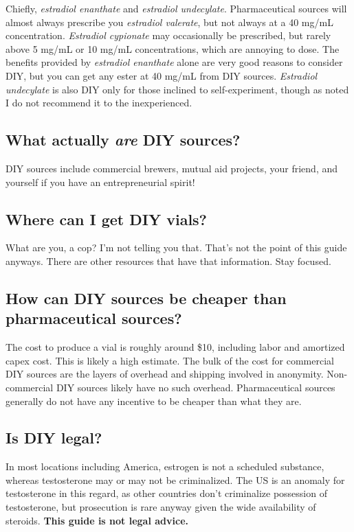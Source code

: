 \documentclass{article}
\begin{document}
Chiefly, \textit{estradiol enanthate} and \textit{estradiol undecylate}. Pharmaceutical sources will almost always prescribe you \textit{estradiol valerate}, but not always at a 40 mg/mL concentration. \textit{Estradiol cypionate} may occasionally be prescribed, but rarely above 5 mg/mL or 10 mg/mL concentrations, which are annoying to dose. The benefits provided by \textit{estradiol enanthate} alone are very good reasons to consider DIY, but you can get any ester at 40 mg/mL from DIY sources. \textit{Estradiol undecylate} is also DIY only for those inclined to self-experiment, though as noted I do not recommend it to the inexperienced.

\subsection{What actually \textit{are} DIY sources?}

DIY sources include commercial brewers, mutual aid projects, your friend, and yourself if you have an entrepreneurial spirit!

\subsection{Where can I get DIY vials?}

What are you, a cop? I’m not telling you that. That’s not the point of this guide anyways. There are other resources that have that information. Stay focused.

\subsection{How can DIY sources be cheaper than pharmaceutical sources?}

The cost to produce a vial is roughly around \$10, including labor and amortized capex cost. This is likely a high estimate. The bulk of the cost for commercial DIY sources are the layers of overhead and shipping involved in anonymity. Non-commercial DIY sources likely have no such overhead. Pharmaceutical sources generally do not have any incentive to be cheaper than what they are.

\subsection{Is DIY legal?}\label{6-11}

In most locations including America, estrogen is not a scheduled substance, whereas testosterone may or may not be criminalized. The US is an anomaly for testosterone in this regard, as other countries don’t criminalize possession of testosterone, but prosecution is rare anyway given the wide availability of steroids. \textbf{This guide is not legal advice.}
\end{document}
